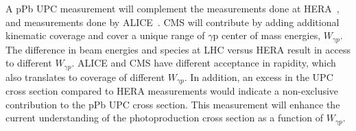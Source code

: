       A pPb UPC \JPsi{} measurement will complement the measurements done at 
        HERA~\cite{Chekanov:2002xi,Aktas:2005xu,Alexa:2013xxa}, and measurements done by ALICE~\cite{TheALICE:2014dwa}.
      CMS will contribute by adding additional kinematic coverage and cover a 
        unique range of $\gamma$p center of mass energies, $W_{\gamma p}$. 
      The difference in beam energies and species at LHC versus HERA result in
        access to different $W_{\gamma p}$. 
      ALICE and CMS have different acceptance in \JPsi{} rapidity, which also 
        translates to coverage of different $W_{\gamma p}$.
      In addition, an excess in the UPC cross section compared to HERA 
        measurements would indicate a non-exclusive contribution to the pPb UPC 
        \JPsi{} cross section. 
      This measurement will \DIFdelbegin {}\DIFdelend enhance the current understanding of 
        the \DIFdelbegin {}\DIFdelend \JPsi{} photoproduction cross section as a function of \DIFaddbegin {}\DIFaddend $W_{\gamma p}$.

